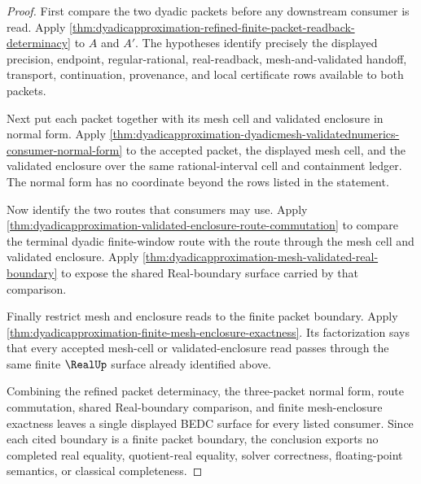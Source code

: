\begin{proof}
First compare the two dyadic packets before any downstream consumer is read.
Apply
\autoref{thm:dyadicapproximation-refined-finite-packet-readback-determinacy}
to $A$ and $A'$. The hypotheses identify precisely the displayed precision,
endpoint, regular-rational, real-readback, mesh-and-validated handoff,
transport, continuation, provenance, and local certificate rows available to
both packets.

Next put each packet together with its mesh cell and validated enclosure in
normal form. Apply
\autoref{thm:dyadicapproximation-dyadicmesh-validatednumerics-consumer-normal-form}
to the accepted packet, the displayed mesh cell, and the validated enclosure
over the same rational-interval cell and containment ledger. The normal form
has no coordinate beyond the rows listed in the statement.

Now identify the two routes that consumers may use. Apply
\autoref{thm:dyadicapproximation-validated-enclosure-route-commutation} to
compare the terminal dyadic finite-window route with the route through the
mesh cell and validated enclosure. Apply
\autoref{thm:dyadicapproximation-mesh-validated-real-boundary} to expose the
shared Real-boundary surface carried by that comparison.

Finally restrict mesh and enclosure reads to the finite packet boundary. Apply
\autoref{thm:dyadicapproximation-finite-mesh-enclosure-exactness}. Its
factorization says that every accepted mesh-cell or validated-enclosure read
passes through the same finite $\RealUp$ surface already identified above.

Combining the refined packet determinacy, the three-packet normal form, route
commutation, shared Real-boundary comparison, and finite mesh-enclosure
exactness leaves a single displayed BEDC surface for every listed consumer.
Since each cited boundary is a finite packet boundary, the conclusion exports
no completed real equality, quotient-real equality, solver correctness,
floating-point semantics, or classical completeness.
\end{proof}
